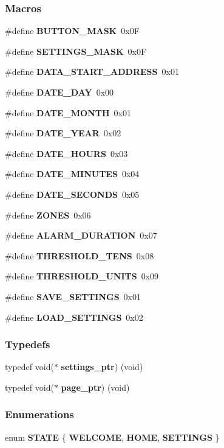 \subsubsection*{Macros}
\begin{DoxyCompactItemize}
\item 
\#define \textbf{ B\+U\+T\+T\+O\+N\+\_\+\+M\+A\+SK}~0x0F
\item 
\#define \textbf{ S\+E\+T\+T\+I\+N\+G\+S\+\_\+\+M\+A\+SK}~0x0F
\item 
\#define \textbf{ D\+A\+T\+A\+\_\+\+S\+T\+A\+R\+T\+\_\+\+A\+D\+D\+R\+E\+SS}~0x01
\item 
\#define \textbf{ D\+A\+T\+E\+\_\+\+D\+AY}~0x00
\item 
\#define \textbf{ D\+A\+T\+E\+\_\+\+M\+O\+N\+TH}~0x01
\item 
\#define \textbf{ D\+A\+T\+E\+\_\+\+Y\+E\+AR}~0x02
\item 
\#define \textbf{ D\+A\+T\+E\+\_\+\+H\+O\+U\+RS}~0x03
\item 
\#define \textbf{ D\+A\+T\+E\+\_\+\+M\+I\+N\+U\+T\+ES}~0x04
\item 
\#define \textbf{ D\+A\+T\+E\+\_\+\+S\+E\+C\+O\+N\+DS}~0x05
\item 
\#define \textbf{ Z\+O\+N\+ES}~0x06
\item 
\#define \textbf{ A\+L\+A\+R\+M\+\_\+\+D\+U\+R\+A\+T\+I\+ON}~0x07
\item 
\#define \textbf{ T\+H\+R\+E\+S\+H\+O\+L\+D\+\_\+\+T\+E\+NS}~0x08
\item 
\#define \textbf{ T\+H\+R\+E\+S\+H\+O\+L\+D\+\_\+\+U\+N\+I\+TS}~0x09
\item 
\#define \textbf{ S\+A\+V\+E\+\_\+\+S\+E\+T\+T\+I\+N\+GS}~0x01
\item 
\#define \textbf{ L\+O\+A\+D\+\_\+\+S\+E\+T\+T\+I\+N\+GS}~0x02
\end{DoxyCompactItemize}
\subsubsection*{Typedefs}
\begin{DoxyCompactItemize}
\item 
typedef void($\ast$ \textbf{ settings\+\_\+ptr}) (void)
\item 
typedef void($\ast$ \textbf{ page\+\_\+ptr}) (void)
\end{DoxyCompactItemize}
\subsubsection*{Enumerations}
\begin{DoxyCompactItemize}
\item 
enum \textbf{ S\+T\+A\+TE} \{ \textbf{ W\+E\+L\+C\+O\+ME}, 
\textbf{ H\+O\+ME}, 
\textbf{ S\+E\+T\+T\+I\+N\+GS}
 \}
\end{DoxyCompactItemize}
